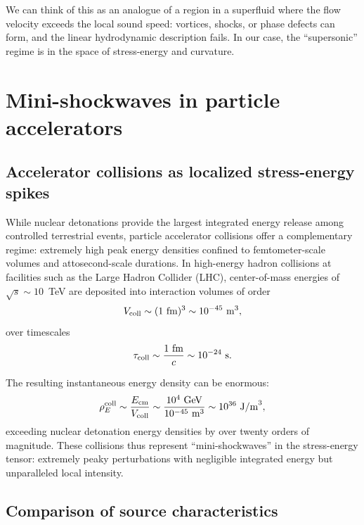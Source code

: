 \documentclass[aps,prd,twocolumn,nofootinbib,superscriptaddress]{revtex4-2}
\begin{document}
We can think of this as an analogue of a region in a superfluid where the flow velocity exceeds the local sound speed: vortices, shocks, or phase defects can form, and the linear hydrodynamic description fails. In our case, the ``supersonic'' regime is in the space of stress-energy and curvature.

\section{Mini-shockwaves in particle accelerators}
\label{sec:accelerators}

\subsection{Accelerator collisions as localized stress-energy spikes}

While nuclear detonations provide the largest integrated energy release among controlled terrestrial events, particle accelerator collisions offer a complementary regime: extremely high peak energy densities confined to femtometer-scale volumes and attosecond-scale durations. In high-energy hadron collisions at facilities such as the Large Hadron Collider (LHC), center-of-mass energies of $\sqrt{s} \sim 10$~TeV are deposited into interaction volumes of order
\begin{equation}
    V_{\rm coll} \sim (1~{\rm fm})^3 \sim 10^{-45}~{\rm m}^3,
\end{equation}
over timescales
\begin{equation}
    \tau_{\rm coll} \sim \frac{1~{\rm fm}}{c} \sim 10^{-24}~{\rm s}.
\end{equation}

The resulting instantaneous energy density can be enormous:
\begin{equation}
    \rho_E^{\rm coll} \sim \frac{E_{\rm cm}}{V_{\rm coll}}
    \sim \frac{10^{4}~{\rm GeV}}{10^{-45}~{\rm m}^3}
    \sim 10^{36}~{\rm J/m}^3,
\end{equation}
exceeding nuclear detonation energy densities by over twenty orders of magnitude. These collisions thus represent ``mini-shockwaves'' in the stress-energy tensor: extremely peaky perturbations with negligible integrated energy but unparalleled local intensity.

\subsection{Comparison of source characteristics}
\end{document}

